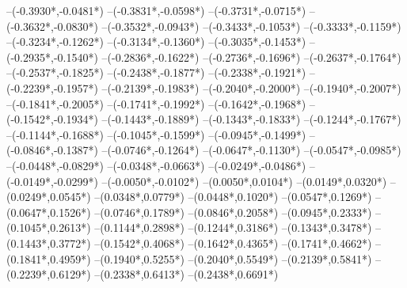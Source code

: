 {	--({-0.3930*\xskala},{-0.0481*\yskala})
	--({-0.3831*\xskala},{-0.0598*\yskala})
	--({-0.3731*\xskala},{-0.0715*\yskala})
	--({-0.3632*\xskala},{-0.0830*\yskala})
	--({-0.3532*\xskala},{-0.0943*\yskala})
	--({-0.3433*\xskala},{-0.1053*\yskala})
	--({-0.3333*\xskala},{-0.1159*\yskala})
	--({-0.3234*\xskala},{-0.1262*\yskala})
	--({-0.3134*\xskala},{-0.1360*\yskala})
	--({-0.3035*\xskala},{-0.1453*\yskala})
	--({-0.2935*\xskala},{-0.1540*\yskala})
	--({-0.2836*\xskala},{-0.1622*\yskala})
	--({-0.2736*\xskala},{-0.1696*\yskala})
	--({-0.2637*\xskala},{-0.1764*\yskala})
	--({-0.2537*\xskala},{-0.1825*\yskala})
	--({-0.2438*\xskala},{-0.1877*\yskala})
	--({-0.2338*\xskala},{-0.1921*\yskala})
	--({-0.2239*\xskala},{-0.1957*\yskala})
	--({-0.2139*\xskala},{-0.1983*\yskala})
	--({-0.2040*\xskala},{-0.2000*\yskala})
	--({-0.1940*\xskala},{-0.2007*\yskala})
	--({-0.1841*\xskala},{-0.2005*\yskala})
	--({-0.1741*\xskala},{-0.1992*\yskala})
	--({-0.1642*\xskala},{-0.1968*\yskala})
	--({-0.1542*\xskala},{-0.1934*\yskala})
	--({-0.1443*\xskala},{-0.1889*\yskala})
	--({-0.1343*\xskala},{-0.1833*\yskala})
	--({-0.1244*\xskala},{-0.1767*\yskala})
	--({-0.1144*\xskala},{-0.1688*\yskala})
	--({-0.1045*\xskala},{-0.1599*\yskala})
	--({-0.0945*\xskala},{-0.1499*\yskala})
	--({-0.0846*\xskala},{-0.1387*\yskala})
	--({-0.0746*\xskala},{-0.1264*\yskala})
	--({-0.0647*\xskala},{-0.1130*\yskala})
	--({-0.0547*\xskala},{-0.0985*\yskala})
	--({-0.0448*\xskala},{-0.0829*\yskala})
	--({-0.0348*\xskala},{-0.0663*\yskala})
	--({-0.0249*\xskala},{-0.0486*\yskala})
	--({-0.0149*\xskala},{-0.0299*\yskala})
	--({-0.0050*\xskala},{-0.0102*\yskala})
	--({0.0050*\xskala},{0.0104*\yskala})
	--({0.0149*\xskala},{0.0320*\yskala})
	--({0.0249*\xskala},{0.0545*\yskala})
	--({0.0348*\xskala},{0.0779*\yskala})
	--({0.0448*\xskala},{0.1020*\yskala})
	--({0.0547*\xskala},{0.1269*\yskala})
	--({0.0647*\xskala},{0.1526*\yskala})
	--({0.0746*\xskala},{0.1789*\yskala})
	--({0.0846*\xskala},{0.2058*\yskala})
	--({0.0945*\xskala},{0.2333*\yskala})
	--({0.1045*\xskala},{0.2613*\yskala})
	--({0.1144*\xskala},{0.2898*\yskala})
	--({0.1244*\xskala},{0.3186*\yskala})
	--({0.1343*\xskala},{0.3478*\yskala})
	--({0.1443*\xskala},{0.3772*\yskala})
	--({0.1542*\xskala},{0.4068*\yskala})
	--({0.1642*\xskala},{0.4365*\yskala})
	--({0.1741*\xskala},{0.4662*\yskala})
	--({0.1841*\xskala},{0.4959*\yskala})
	--({0.1940*\xskala},{0.5255*\yskala})
	--({0.2040*\xskala},{0.5549*\yskala})
	--({0.2139*\xskala},{0.5841*\yskala})
	--({0.2239*\xskala},{0.6129*\yskala})
	--({0.2338*\xskala},{0.6413*\yskala})
	--({0.2438*\xskala},{0.6691*\yskala})
}
